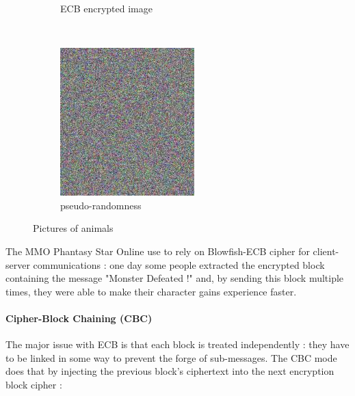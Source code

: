 \begin{figure}[h!]
\begin{subfigure}[c]{0.27\textwidth}
                \caption{ECB encrypted image}
                \label{fig:ECB_Exemple_encrypted}
        \end{subfigure}
		~		        
        \begin{subfigure}[c]{0.27\textwidth}
                \centering
                \includegraphics[width=\textwidth]{images/Tux_secure.jpg}
                \caption{  pseudo-randomness }
                \label{fig:ECB_Exemple_objectif}
        \end{subfigure}
        \caption{Pictures of animals}\label{fig:ECB_flaw}
\end{figure}

The MMO Phantasy Star Online use to rely on Blowfish-ECB cipher for client-server communications : one day some people extracted the encrypted block containing the message "Monster Defeated !" and, by sending this block multiple times, they were able to make their character gains experience faster.

\paragraph{ Cipher-Block Chaining (CBC) }

The major issue with ECB is that each block is treated independently : they have to be linked in some way to prevent the forge of sub-messages. The CBC mode does that by injecting the previous block's ciphertext into the next encryption block cipher : 

